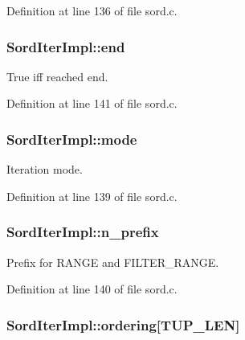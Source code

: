 Definition at line 136 of file sord.\+c.

\subsubsection[{\texorpdfstring{end}{end}}]{ Sord\+Iter\+Impl\+::end}\hypertarget{struct_sord_iter_impl_a9f06edee03a201a00f7ef17a4beda272}{}\label{struct_sord_iter_impl_a9f06edee03a201a00f7ef17a4beda272}


True iff reached end. 



Definition at line 141 of file sord.\+c.

\subsubsection[{\texorpdfstring{mode}{mode}}]{ Sord\+Iter\+Impl\+::mode}\hypertarget{struct_sord_iter_impl_a857921dd49f48ae2471dc39a5573fbff}{}\label{struct_sord_iter_impl_a857921dd49f48ae2471dc39a5573fbff}


Iteration mode. 



Definition at line 139 of file sord.\+c.

\subsubsection[{\texorpdfstring{n\+\_\+prefix}{n_prefix}}]{ Sord\+Iter\+Impl\+::n\+\_\+prefix}\hypertarget{struct_sord_iter_impl_ab4f3c352b905bb73293eb4750bf5c5c1}{}\label{struct_sord_iter_impl_ab4f3c352b905bb73293eb4750bf5c5c1}


Prefix for R\+A\+N\+GE and F\+I\+L\+T\+E\+R\+\_\+\+R\+A\+N\+GE. 



Definition at line 140 of file sord.\+c.

\subsubsection[{\texorpdfstring{ordering}{ordering}}]{ Sord\+Iter\+Impl\+::ordering\mbox{[}{\bf T\+U\+P\+\_\+\+L\+EN}\mbox{]}}\hypertarget{struct_sord_iter_impl_a289a91ce551c37a315ace3a69b4218a5}{}\label{struct_sord_iter_impl_a289a91ce551c37a315ace3a69b4218a5}


